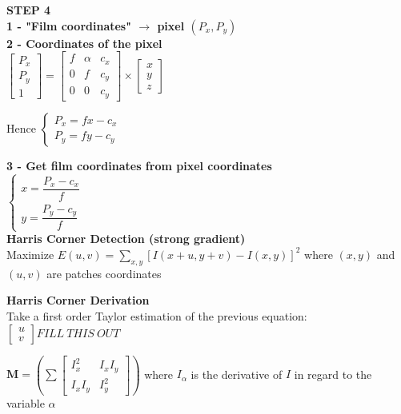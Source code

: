 \documentclass[10pt,letterpaper,landscape]{report}
\newcommand{\boxheight}{21.59cm}
\newcommand{\boxwidth}{8.85cm}
\begin{document}
\begin{small}
{\begin{minipage}[t][\boxheight][c]{\boxwidth}
    \textbf{STEP 4}\\
    \textbf{1 - "Film coordinates" $\rightarrow$ pixel $(P_x, P_y)$} \\
    \textbf{2 - Coordinates of the pixel}\\
    $\begin{bmatrix}
    P_x \\ P_y \\ 1
    \end{bmatrix} = 
    \begin{bmatrix}
    f & \alpha & c_x \\
    0 & f & c_y \\
    0 & 0 & c_y
    \end{bmatrix}
    \times 
    \begin{bmatrix}
    x \\ y \\ z
    \end{bmatrix}$
    
    Hence 
    $\left\{
    \begin{matrix}
    P_x = fx- c_x \\
    P_y = fy - c_y
    \end{matrix}
    \right.
    $
    
    \textbf{3 - Get film coordinates from pixel coordinates} \\
    $\left\{
    \begin{array}{l}
    x = \dfrac{P_x - c_x}{f} \\
    y = \dfrac{P_y - c_y}{f}
    \end{array}
    \right.
    $\\
    
    \textbf{Harris Corner Detection (strong gradient)} \\
    Maximize $E(u,v) = \sum_{x,y} \left[I(x+u, y+v) - I(x, y)\right]^2$ where $(x,y)$ and $(u,v)$ are patches coordinates
    
    \textbf{Harris Corner Derivation}\\
    Take a first order Taylor estimation of the previous equation: \\
    $\begin{bmatrix} u \\ v
    \end{bmatrix}FILL\ THIS\ OUT$
    
    $\mathbf{M} = \left(\sum \begin{bmatrix}I_x^2 & I_x I_y \\ I_x I_y & I_y^2\end{bmatrix}\right)$ where $I_\alpha$ is the derivative of $I$ in regard to the variable $\alpha$
    

\end{minipage}}
\end{small}
\end{document}
